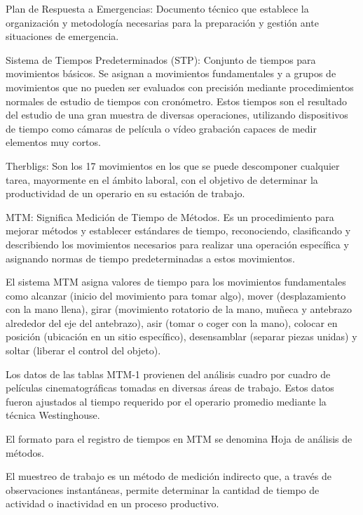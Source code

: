     Plan de Respuesta a Emergencias: Documento técnico que establece la organización y metodología necesarias para la preparación y gestión ante situaciones de emergencia.
    
    Sistema de Tiempos Predeterminados (STP): Conjunto de tiempos para movimientos básicos. Se asignan a movimientos fundamentales y a grupos de movimientos que no pueden ser evaluados con precisión mediante procedimientos normales de estudio de tiempos con cronómetro. Estos tiempos son el resultado del estudio de una gran muestra de diversas operaciones, utilizando dispositivos de tiempo como cámaras de película o vídeo grabación capaces de medir elementos muy cortos.
    
    Therbligs: Son los 17 movimientos en los que se puede descomponer cualquier tarea, mayormente en el ámbito laboral, con el objetivo de determinar la productividad de un operario en su estación de trabajo.
    
    MTM: Significa Medición de Tiempo de Métodos. Es un procedimiento para mejorar métodos y establecer estándares de tiempo, reconociendo, clasificando y describiendo los movimientos necesarios para realizar una operación específica y asignando normas de tiempo predeterminadas a estos movimientos. 
    
    El sistema MTM asigna valores de tiempo para los movimientos fundamentales como alcanzar (inicio del movimiento para tomar algo), mover (desplazamiento con la mano llena), girar (movimiento rotatorio de la mano, muñeca y antebrazo alrededor del eje del antebrazo), asir (tomar o coger con la mano), colocar en posición (ubicación en un sitio específico), desensamblar (separar piezas unidas) y soltar (liberar el control del objeto). 
    
    Los datos de las tablas MTM-1 provienen del análisis cuadro por cuadro de películas cinematográficas tomadas en diversas áreas de trabajo. Estos datos fueron ajustados al tiempo requerido por el operario promedio mediante la técnica Westinghouse.
    
    El formato para el registro de tiempos en MTM se denomina Hoja de análisis de métodos.
    
    El muestreo de trabajo es un método de medición indirecto que, a través de observaciones instantáneas, permite determinar la cantidad de tiempo de actividad o inactividad en un proceso productivo.
